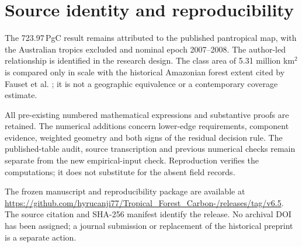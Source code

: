 \documentclass[11pt,a4paper]{article}
\begin{document}
\section{Source identity and reproducibility}
The 723.97\,PgC result remains attributed to the published pantropical map, with the Australian tropics excluded and nominal epoch 2007--2008. The author-led relationship is identified in the research design. The class area of 5.31 million km$^2$ is compared only in scale with the historical Amazonian forest extent cited by Fauset et al. \citep{Fauset2015}; it is not a geographic equivalence or a contemporary coverage estimate.

All pre-existing numbered mathematical expressions and substantive proofs are retained. The numerical additions concern lower-edge requirements, component evidence, weighted geometry and both signs of the residual decision rule. The published-table audit, source transcription and previous numerical checks remain separate from the new empirical-input check. Reproduction verifies the computations; it does not substitute for the absent field records.

The frozen manuscript and reproducibility package are available at \url{https://github.com/hyrucanji77/Tropical_Forest_Carbon-/releases/tag/v6.5}. The source citation and SHA-256 manifest identify the release. No archival DOI has been assigned; a journal submission or replacement of the historical preprint is a separate action.

\end{document}
